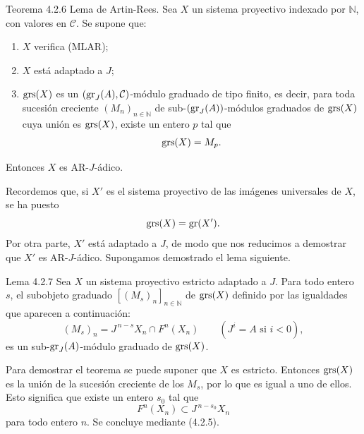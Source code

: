 \begin{statement}{Teorema 4.2.6}
Lema de Artin-Rees. Sea \(X\) un sistema proyectivo indexado por \(\mathbb N\), con valores en \(\mathcal C\). Se supone que:
\begin{enumerate}[label=\textup{(\roman*)}]
\item \(X\) verifica (MLAR);
\item \(X\) está adaptado a \(J\);
\item \(\operatorname{grs}(X)\) es un \((\operatorname{gr}_J(A),\mathcal C)\)-módulo graduado de tipo finito, es decir, para toda sucesión creciente \((M_n)_{n\in\mathbb N}\) de sub-\((\operatorname{gr}_J(A))\)-módulos graduados de \(\operatorname{grs}(X)\) cuya unión es \(\operatorname{grs}(X)\), existe un entero \(p\) tal que
\[
\operatorname{grs}(X)=M_p.
\]
\end{enumerate}
Entonces \(X\) es AR-\(J\)-ádico.
\end{statement}

\begin{prooftext}
Recordemos que, si \(X'\) es el sistema proyectivo de las imágenes universales de \(X\), se ha puesto
\[
\operatorname{grs}(X)=\operatorname{gr}(X').
\]
Por otra parte, \(X'\) está adaptado a \(J\), de modo que nos reducimos a demostrar que \(X'\) es AR-\(J\)-ádico. Supongamos demostrado el lema siguiente.
\end{prooftext}

\begin{statement}{Lema 4.2.7}
Sea \(X\) un sistema proyectivo estricto adaptado a \(J\). Para todo entero \(s\), el subobjeto graduado \([(M_s)_n]_{n\in\mathbb N}\) de \(\operatorname{grs}(X)\) definido por las igualdades que aparecen a continuación:
\[
(M_s)_n=J^{\,n-s}X_n\cap F^n(X_n)\qquad(J^i=A\text{ si }i<0),
\]
es un sub-\(\operatorname{gr}_J(A)\)-módulo graduado de \(\operatorname{grs}(X)\).
\end{statement}

Para demostrar el teorema se puede suponer que \(X\) es estricto. Entonces \(\operatorname{grs}(X)\) es la unión de la sucesión creciente de los \(M_s\), por lo que es igual a uno de ellos. Esto significa que existe un entero \(s_0\) tal que
\[
F^n(X_n)\subset J^{\,n-s_0}X_n
\]
para todo entero \(n\). Se concluye mediante (4.2.5).
